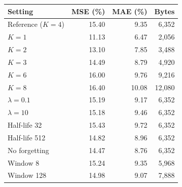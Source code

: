 \begingroup\fontsize{9}{11}\selectfont
\setlength{\tabcolsep}{4pt}
\renewcommand{\arraystretch}{1.12}
\begin{tabular}{@{}lrrr@{}}
\toprule
Setting & MSE (\%) & MAE (\%) & Bytes \\
\midrule
Reference ($K=4$) & 15.40 & 9.35 & 6,352 \\
$K=1$ & 11.13 & 6.47 & 2,056 \\
$K=2$ & 13.10 & 7.85 & 3,488 \\
$K=3$ & 14.49 & 8.79 & 4,920 \\
$K=6$ & 16.00 & 9.76 & 9,216 \\
$K=8$ & 16.40 & 10.08 & 12,080 \\
$\lambda=0.1$ & 15.19 & 9.17 & 6,352 \\
$\lambda=10$ & 15.18 & 9.46 & 6,352 \\
Half-life 32 & 15.43 & 9.72 & 6,352 \\
Half-life 512 & 14.82 & 8.96 & 6,352 \\
No forgetting & 14.47 & 8.76 & 6,352 \\
Window 8 & 15.24 & 9.35 & 5,968 \\
Window 128 & 14.98 & 9.07 & 7,888 \\
\bottomrule
\end{tabular}
\endgroup
